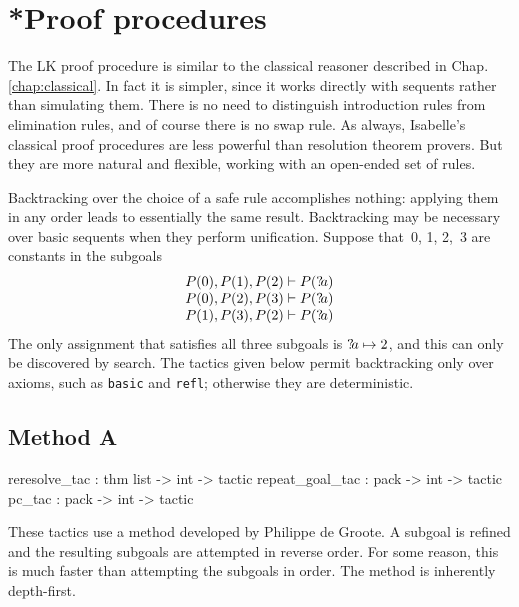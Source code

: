 \section{*Proof procedures}\label{sec:sequent-provers}

The LK proof procedure is similar to the classical reasoner described in
%
            {Chap.\ts\ref{chap:classical}}.  
%
In fact it is simpler, since it works directly with sequents rather than
simulating them.  There is no need to distinguish introduction rules from
elimination rules, and of course there is no swap rule.  As always,
Isabelle's classical proof procedures are less powerful than resolution
theorem provers.  But they are more natural and flexible, working with an
open-ended set of rules.

Backtracking over the choice of a safe rule accomplishes nothing: applying
them in any order leads to essentially the same result.  Backtracking may
be necessary over basic sequents when they perform unification.  Suppose
that~0, 1, 2,~3 are constants in the subgoals
\[  \begin{array}{c}
      P(0), P(1), P(2) \vdash P({?\!a})  \\
      P(0), P(2), P(3) \vdash P({?\!a})  \\
      P(1), P(3), P(2) \vdash P({?\!a})  
    \end{array}
\]
The only assignment that satisfies all three subgoals is ${?\!a}\mapsto 2$,
and this can only be discovered by search.  The tactics given below permit
backtracking only over axioms, such as {\tt basic} and {\tt refl};
otherwise they are deterministic.


\subsection{Method A}
\begin{ttbox} 
reresolve_tac   : thm list -> int -> tactic
repeat_goal_tac : pack -> int -> tactic
pc_tac          : pack -> int -> tactic
\end{ttbox}
These tactics use a method developed by Philippe de Groote.  A subgoal is
refined and the resulting subgoals are attempted in reverse order.  For
some reason, this is much faster than attempting the subgoals in order.
The method is inherently depth-first.

